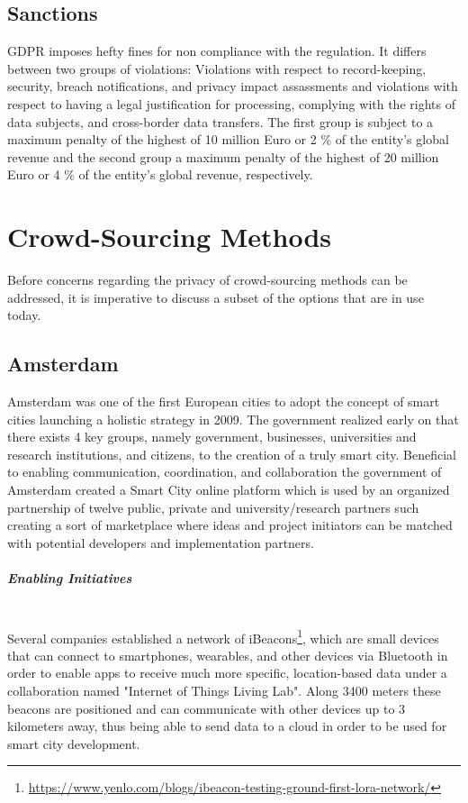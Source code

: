 \documentclass[a4paper,12pt]{report}
\begin{document}
	\section{Sanctions}
	\startsection
	GDPR imposes hefty fines for non compliance with the regulation.
	It differs between two groups of violations: Violations with respect to record-keeping, security, breach notifications, and privacy impact assassments and violations with respect to having a legal justification for processing, complying with the rights of data subjects, and cross-border data transfers.
	The first group is subject to a maximum penalty of the highest of 10 million Euro or 2 \% of the entity's global revenue and the second group a maximum penalty of the highest of 20 million Euro or 4 \% of the entity's global revenue, respectively.
	\closesection
	
	
	\chapter{Crowd-Sourcing Methods} \label{Crowd-Sourcing Methods}
	Before concerns regarding the privacy of crowd-sourcing methods can be addressed, it is imperative to discuss a subset of the options that are in use today.
	
	\section[Amsterdam]{Amsterdam \cite{SmartCityAmsterdam}} \label{Amsterdam}
	\startsection
		Amsterdam was one of the first European cities to adopt the concept of smart cities launching a holistic strategy in 2009. 
		The government realized early on that there exists 4 key groups, namely government, businesses, universities and research institutions, and citizens, to the creation of a truly smart city. 
		Beneficial to enabling communication, coordination, and collaboration the government of Amsterdam created a Smart City online platform which is used by an organized partnership of twelve public, private and university/research partners such creating a sort of marketplace where ideas and project initiators can be matched with potential developers and implementation partners.
		\paragraph{Enabling Initiatives} \hfill \\
		Several companies established a network of iBeacons\footnote{\url{https://www.yenlo.com/blogs/ibeacon-testing-ground-first-lora-network/}}, which are small devices that can connect to smartphones, wearables, and other devices via Bluetooth in order to enable apps to receive much more specific, location-based data under a collaboration named "Internet of Things Living Lab". 
		Along 3400 meters these beacons are positioned and can communicate with other devices up to 3 kilometers away, thus being able to send data to a cloud in order to be used for smart city development.
\end{document}
